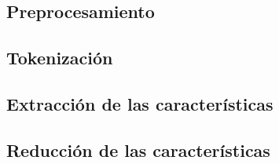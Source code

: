 \documentclass[a4paper,12pt]{report}
\begin{document}
\subsection{Preprocesamiento}

\subsection{Tokenización}

\subsection{Extracción de las características}


\subsection{Reducción de las características}
\end{document}
